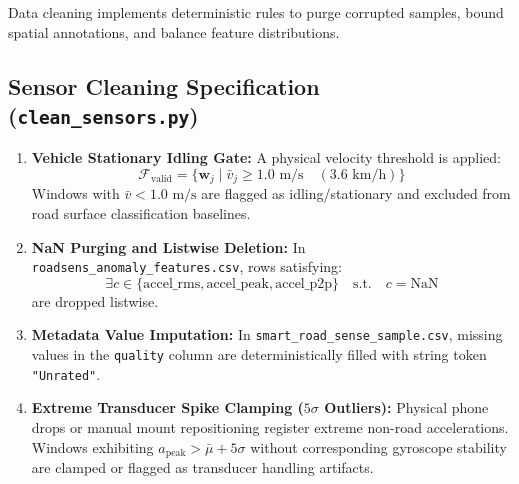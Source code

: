 \documentclass[11pt,a4paper]{article}
\begin{document}
Data cleaning implements deterministic rules to purge corrupted samples, bound spatial annotations, and balance feature distributions.

\subsection{Sensor Cleaning Specification (\texttt{clean\_sensors.py})}
\begin{enumerate}
    \item \textbf{Vehicle Stationary Idling Gate:}
    A physical velocity threshold is applied:
    \begin{equation}
    \mathcal{F}_{\text{valid}} = \{ \mathbf{w}_j \mid \bar{v}_j \ge 1.0\text{ m/s} \quad (3.6\text{ km/h}) \}
    \end{equation}
    Windows with $\bar{v} < 1.0\text{ m/s}$ are flagged as idling/stationary and excluded from road surface classification baselines.
    
    \item \textbf{NaN Purging and Listwise Deletion:}
    In \texttt{roadsens\_anomaly\_features.csv}, rows satisfying:
    \begin{equation}
    \exists c \in \{\text{accel\_rms}, \text{accel\_peak}, \text{accel\_p2p}\} \quad \text{s.t.} \quad c = \text{NaN}
    \end{equation}
    are dropped listwise.
    
    \item \textbf{Metadata Value Imputation:}
    In \texttt{smart\_road\_sense\_sample.csv}, missing values in the \texttt{quality} column are deterministically filled with string token \texttt{"Unrated"}.
    
    \item \textbf{Extreme Transducer Spike Clamping ($5\sigma$ Outliers):}
    Physical phone drops or manual mount repositioning register extreme non-road accelerations. Windows exhibiting $a_{\text{peak}} > \bar{\mu} + 5\sigma$ without corresponding gyroscope stability are clamped or flagged as transducer handling artifacts.
\end{enumerate}
\end{document}
